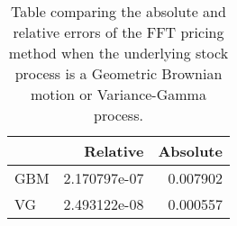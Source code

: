 \begin{table}
\centering
\caption{Table comparing the absolute and relative errors of the FFT pricing            method when the underlying stock process is a Geometric Brownian            motion or Variance-Gamma process.}
\begin{tabular}{lrr}
\toprule
{} &      Relative &  Absolute \\
\midrule
GBM &  2.170797e-07 &  0.007902 \\
VG  &  2.493122e-08 &  0.000557 \\
\bottomrule
\end{tabular}
\end{table}
